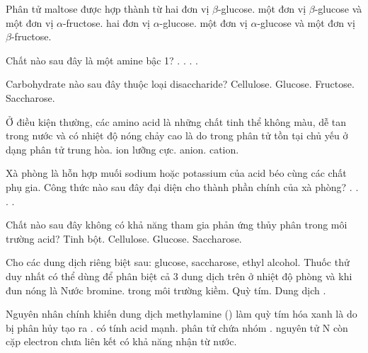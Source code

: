 \documentclass[11pt,a4paper]{article}
\begin{document}
\begin{ex}
Phân tử maltose được hợp thành từ
\choice
{hai đơn vị $\beta$-glucose.}
{một đơn vị $\beta$-glucose và một đơn vị $\alpha$-fructose.}
{\True hai đơn vị $\alpha$-glucose.}
{một đơn vị $\alpha$-glucose và một đơn vị $\beta$-fructose.}
\end{ex}

\begin{ex}
Chất nào sau đây là một amine bậc 1?
\choice
{\True {}.}
{.}
{.}
{.}
\end{ex}

\begin{ex}
Carbohydrate nào sau đây thuộc loại disaccharide?
\choice
{Cellulose.}
{Glucose.}
{Fructose.}
{\True Saccharose.}
\end{ex}

\begin{ex}
Ở điều kiện thường, các amino acid là những chất tinh thể không màu, dễ tan trong nước và có nhiệt độ nóng chảy cao là do trong phân tử tồn tại chủ yếu ở dạng
\choice
{phân tử trung hòa.}
{\True ion lưỡng cực.}
{anion.}
{cation.}
\end{ex}

\begin{ex}
Xà phòng là hỗn hợp muối sodium hoặc potassium của acid béo cùng các chất phụ gia. Công thức nào sau đây đại diện cho thành phần chính của xà phòng?
\choice
{.}
{.}
{\True {}.}
{.}
\end{ex}

\begin{ex}
Chất nào sau đây không có khả năng tham gia phản ứng thủy phân trong môi trường acid?
\choice
{Tinh bột.}
{Cellulose.}
{\True Glucose.}
{Saccharose.}
\end{ex}

\begin{ex}
Cho các dung dịch riêng biệt sau: glucose, saccharose, ethyl alcohol. Thuốc thử duy nhất có thể dùng để phân biệt cả 3 dung dịch trên ở nhiệt độ phòng và khi đun nóng là
\choice
{Nước bromine.}
{\True {} trong môi trường kiềm.}
{Quỳ tím.}
{Dung dịch .}
\end{ex}

\begin{ex}
Nguyên nhân chính khiến dung dịch methylamine () làm quỳ tím hóa xanh là do
\choice
{ bị phân hủy tạo ra .}
{ có tính acid mạnh.}
{phân tử  chứa nhóm .}
{\True nguyên tử N còn cặp electron chưa liên kết có khả năng nhận  từ nước.}
\end{ex}
\end{document}
